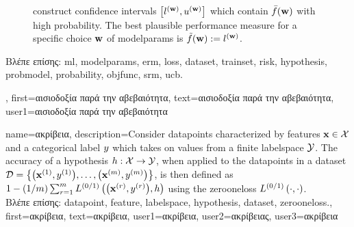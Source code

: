{{\begin{figure}[H]
\begin{center}
{	construct confidence intervals $\big[ l^{({\bf w})},  u^{({\bf w})} \big]$ which contain $\bar{f}({\bf w})$  
	with high probability. The best plausible performance measure for a specific choice ${\bf w}$ of \gls{modelparams} 
	is $\tilde{f}({\bf w}) := l^{({\bf w})}$.} 
	\end{center}
		\end{figure}
	\foreignlanguage{greek}{Βλέπε επίσης:} \gls{ml}, \gls{modelparams}, \gls{erm}, \gls{loss}, \gls{dataset}, \gls{trainset}, \gls{risk}, \gls{hypothesis}, \gls{probmodel}, \gls{probability}, \gls{objfunc}, \gls{srm}, \gls{ucb}.},
	first={\foreignlanguage{greek}{αισιοδοξία παρά την αβεβαιότητα}},
	text={\foreignlanguage{greek}{αισιοδοξία παρά την αβεβαιότητα}},
	user1={\foreignlanguage{greek}{αισιοδοξία παρά την αβεβαιότητα}} %
}

{name={\foreignlanguage{greek}{ακρίβεια}},
	description={Consider \gls{datapoint}s characterized by \gls{feature}s ${\bf x} \in \mathcal{X}$ and 
		a categorical label $y$ which takes on values from a finite \gls{labelspace} $\mathcal{Y}$. The 
		accuracy of a \gls{hypothesis} $h: \mathcal{X} \rightarrow \mathcal{Y}$, when applied 
		to the \gls{datapoint}s in a \gls{dataset} $\mathcal{D} = \big\{ \big({\bf x}^{(1)}, y^{(1)} \big), \ldots, \big({\bf x}^{(m)},y^{(m)}\big) \big\}$, 
		is then defined as $1 - (1/m)\sum_{r=1}^{m} L^{(0/1)}\left(\big({\bf x}^{(r)},y^{(r)}\big),h \right)$ using the \gls{zerooneloss} $L^{(0/1)}\left(\cdot,\cdot \right)$.\\
		\foreignlanguage{greek}{Βλέπε επίσης:} \gls{datapoint}, \gls{feature}, \gls{labelspace}, \gls{hypothesis}, \gls{dataset}, \gls{zerooneloss}.},
	first={\foreignlanguage{greek}{ακρίβεια}},
	text={\foreignlanguage{greek}{ακρίβεια}},
	user1={\foreignlanguage{greek}{ακρίβεια}}, %
	user2={\foreignlanguage{greek}{ακρίβειας}}, %
	user3={\foreignlanguage{greek}{ακρίβεια}} %
}

